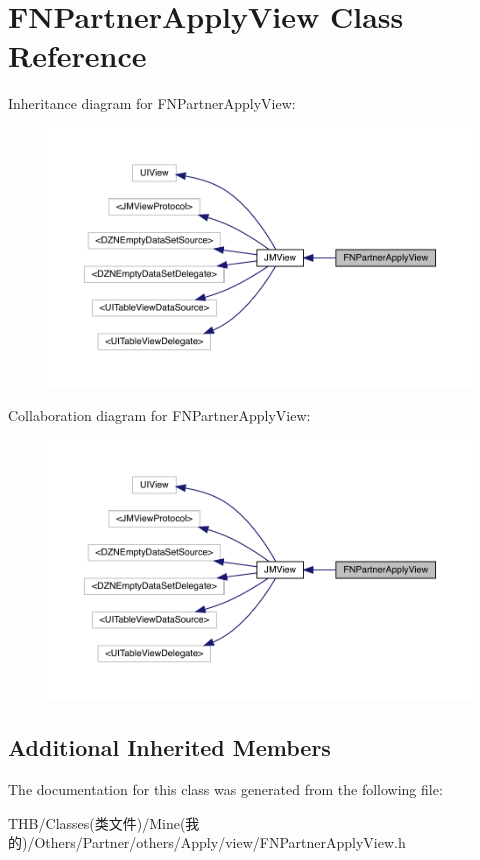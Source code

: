 \hypertarget{interface_f_n_partner_apply_view}{}\section{F\+N\+Partner\+Apply\+View Class Reference}
\label{interface_f_n_partner_apply_view}


Inheritance diagram for F\+N\+Partner\+Apply\+View\+:\nopagebreak
\begin{figure}[H]
\begin{center}
\leavevmode
\includegraphics[width=350pt]{interface_f_n_partner_apply_view__inherit__graph}
\end{center}
\end{figure}


Collaboration diagram for F\+N\+Partner\+Apply\+View\+:\nopagebreak
\begin{figure}[H]
\begin{center}
\leavevmode
\includegraphics[width=350pt]{interface_f_n_partner_apply_view__coll__graph}
\end{center}
\end{figure}
\subsection*{Additional Inherited Members}


The documentation for this class was generated from the following file\+:\begin{DoxyCompactItemize}
\item 
T\+H\+B/\+Classes(类文件)/\+Mine(我的)/\+Others/\+Partner/others/\+Apply/view/F\+N\+Partner\+Apply\+View.\+h\end{DoxyCompactItemize}
